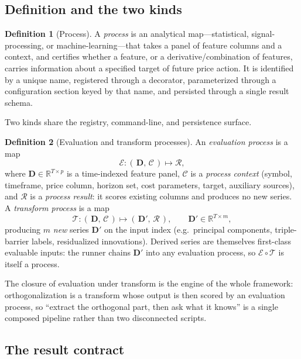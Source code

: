 \documentclass[11pt,a4paper]{article}
\theoremstyle{definition}
\newtheorem{definition}{Definition}[section]
\theoremstyle{plain}
\newcommand{\R}{\mathbb{R}}
\begin{document}
\subsection{Definition and the two kinds}

\begin{definition}[Process]
\label{def:process}
A \emph{process} is an analytical map---statistical, signal-processing, or machine-learning---that
takes a panel of feature columns and a context, and certifies whether a feature, or a
derivative/combination of features, carries information about a specified target of future price
action. It is identified by a unique name, registered through a decorator, parameterized through a
configuration section keyed by that name, and persisted through a single result schema.
\end{definition}

Two kinds share the registry, command-line, and persistence surface.

\begin{definition}[Evaluation and transform processes]
An \emph{evaluation process} is a map
\[
   \mathcal{E} : (\,\mathbf{D},\, \mathcal{C}\,) \longmapsto \mathcal{R},
\]
where $\mathbf{D}\in\R^{T\times p}$ is a time-indexed feature panel, $\mathcal{C}$ is a
\emph{process context} (symbol, timeframe, price column, horizon set, cost parameters, target,
auxiliary sources), and $\mathcal{R}$ is a \emph{process result}: it scores existing columns and
produces no new series. A \emph{transform process} is a map
\[
   \mathcal{T} : (\,\mathbf{D},\, \mathcal{C}\,) \longmapsto (\,\mathbf{D}',\, \mathcal{R}\,),
   \qquad \mathbf{D}' \in \R^{T\times m},
\]
producing $m$ \emph{new} series $\mathbf{D}'$ on the input index (e.g.\ principal components,
triple-barrier labels, residualized innovations). Derived series are themselves first-class
evaluable inputs: the runner chains $\mathbf{D}'$ into any evaluation process, so
$\mathcal{E}\circ\mathcal{T}$ is itself a process.
\end{definition}

The closure of evaluation under transform is the engine of the whole framework: orthogonalization
is a transform whose output is then scored by an evaluation process, so ``extract the orthogonal
part, then ask what it knows'' is a single composed pipeline rather than two disconnected scripts.

\subsection{The result contract}
\end{document}
